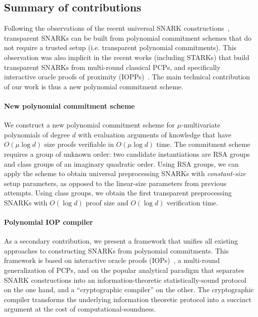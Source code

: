 \subsection{Summary of contributions} 
Following the observations of the recent universal SNARK constructions~\cite{Plonk, Sonic, Libra}, transparent SNARKs can be built from polynomial commitment schemes that do not require a trusted setup (i.e. transparent polynomial commitments). This observation was also implicit in the recent works (including STARKs) that build transparent SNARKs from multi-round classical PCPs, and specifically interactive oracle proofs of proximity (IOPPs)~\cite{ICALP:BBHR18}. The main technical contribution of our work is thus a new polynomial commitment scheme.

\paragraph{New polynomial commitment scheme} We construct a new polynomial commitment scheme for $\mu$-multivariate polynomials of degree $d$ with evaluation arguments of knowledge that have $O(\mu \log d)$ size proofs verifiable in $O(\mu \log d)$ time. The commitment scheme requires a group of unknown order: two candidate instantiations are RSA groups and class groups of an imaginary quadratic order. Using RSA groups, we can apply the scheme to obtain universal preprocessing SNARKs with \emph{constant-size} setup parameters, as opposed to the linear-size parameters from previous attempts. Using class groups, we obtain the first transparent preprocessing SNARKs with $O(\log d)$ proof size and $O(\log d)$ verification time. %

\paragraph{Polynomial IOP compiler} As a secondary contribution, we present a framework that unifies all existing approaches to constructing SNARKs from polynomial commitments. This framework is based on interactive oracle proofs (IOPs)~\cite{STOC:ReiRotRot16, TCC:BenChiSpo16}, a multi-round generalization of PCPs, and on the popular analytical paradigm that separates SNARK constructions into an information-theoretic statistically-sound protocol on the one hand, and a ``cryptographic compiler'' on the other. The cryptographic compiler transforms the underlying information theoretic protocol into a succinct argument at the cost of computational-soundness. 

